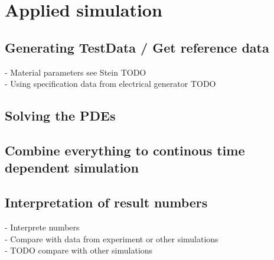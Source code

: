 \documentclass[parskip=half, titlepage=yes, 12pt, BCOR=12mm, DIV=calc]{scrartcl}
\begin{document}
\section{Applied simulation}
\subsection{Generating TestData / Get reference data}
- Material parameters see Stein TODO \\
- Using specification data from electrical generator TODO \\

\subsection{Solving the PDEs}

\subsection{Combine everything to continous time dependent simulation}

\subsection{Interpretation of result numbers}
- Interprete numbers \\
- Compare with data from experiment or other simulations \\
- TODO compare with other simulations \\
\end{document}
